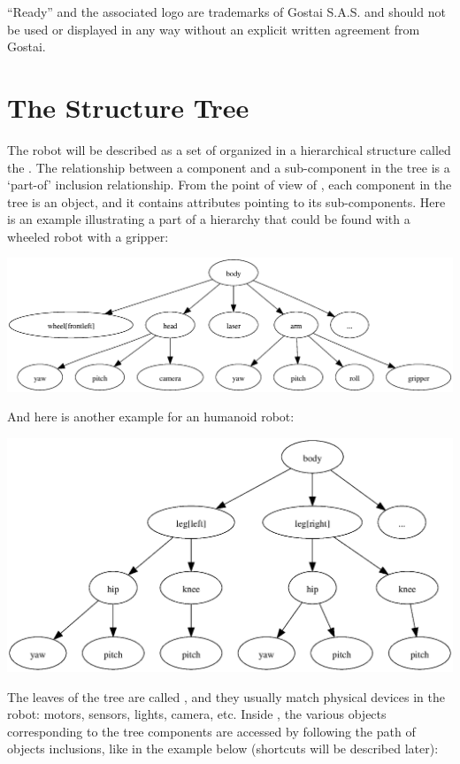 ``\urbi Ready'' and the associated logo are trademarks of Gostai S.A.S. and
should not be used or displayed in any way without an explicit written
agreement from Gostai.

\section{The Structure Tree}

The robot will be described as a set of  organized in a
hierarchical structure called the . The relationship
between a component and a sub-component in the tree is a `part-of' inclusion
relationship. From the point of view of \urbi, each component in the tree is
an object, and it contains attributes pointing to its sub-components. Here
is an example illustrating a part of a hierarchy that could be found with a
wheeled robot with a gripper:

\begin{center}
  \includegraphics[width=.8\linewidth]{img/structure-tree-wheeled}
\end{center}

And here is another example for an humanoid robot:

\begin{center}
  \includegraphics[width=.8\linewidth]{img/structure-tree-humanoid}
\end{center}

The leaves of the tree are called , and they usually match
physical devices in the robot: motors, sensors, lights, camera, etc. Inside
\urbi, the various objects corresponding to the tree components are accessed
by following the path of objects inclusions, like in the example below
(shortcuts will be described later):

